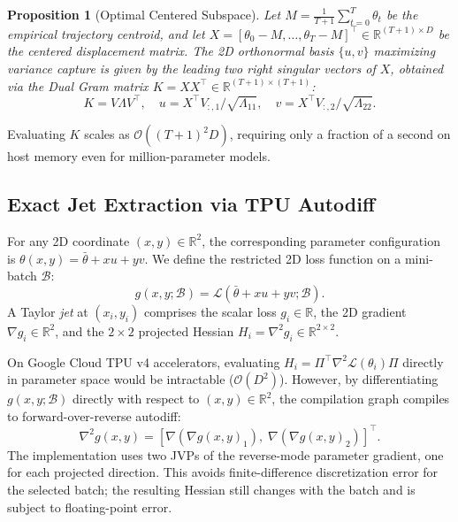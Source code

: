 \documentclass[11pt,a4paper]{article}
\newtheorem{proposition}[theorem]{Proposition}
\theoremstyle{definition}
\theoremstyle{remark}
\begin{document}
\begin{proposition}[Optimal Centered Subspace]
Let $M = \frac{1}{T+1} \sum_{t=0}^T \theta_t$ be the empirical trajectory centroid, and let $X = [\theta_0 - M, \dots, \theta_T - M]^\top \in \mathbb{R}^{(T+1) \times D}$ be the centered displacement matrix. The 2D orthonormal basis $\{u, v\}$ maximizing variance capture is given by the leading two right singular vectors of $X$, obtained via the Dual Gram matrix $K = X X^\top \in \mathbb{R}^{(T+1) \times (T+1)}$:
\begin{equation}
    K = V \Lambda V^\top, \quad u = X^\top V_{:, 1} / \sqrt{\Lambda_{11}}, \quad v = X^\top V_{:, 2} / \sqrt{\Lambda_{22}}.
\end{equation}
\end{proposition}
Evaluating $K$ scales as $\mathcal{O}((T+1)^2 D)$, requiring only a fraction of a second on host memory even for million-parameter models.

\subsection{Exact Jet Extraction via TPU Autodiff}
For any 2D coordinate $(x, y) \in \mathbb{R}^2$, the corresponding parameter configuration is $\theta(x, y) = \bar{\theta} + x u + y v$. We define the restricted 2D loss function on a mini-batch $\mathcal{B}$:
\begin{equation}
    g(x, y; \mathcal{B}) = \mathcal{L}(\bar{\theta} + x u + y v; \mathcal{B}).
\end{equation}
A Taylor \emph{jet} at $(x_i, y_i)$ comprises the scalar loss $g_i \in \mathbb{R}$, the 2D gradient $\nabla g_i \in \mathbb{R}^2$, and the $2 \times 2$ projected Hessian $H_i = \nabla^2 g_i \in \mathbb{R}^{2 \times 2}$.

On Google Cloud TPU v4 accelerators, evaluating $H_i = \Pi^\top \nabla^2 \mathcal{L}(\theta_i) \Pi$ directly in parameter space would be intractable ($\mathcal{O}(D^2)$). However, by differentiating $g(x, y; \mathcal{B})$ directly with respect to $(x, y) \in \mathbb{R}^2$, the compilation graph compiles to forward-over-reverse autodiff:
\begin{equation}
    \nabla^2 g(x, y) = \left[ \nabla (\nabla g(x, y)_1), \; \nabla (\nabla g(x, y)_2) \right]^\top.
\end{equation}
The implementation uses two JVPs of the reverse-mode parameter gradient, one for each projected direction. This avoids finite-difference discretization error for the selected batch; the resulting Hessian still changes with the batch and is subject to floating-point error.
\end{document}
